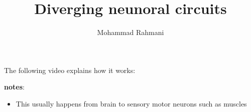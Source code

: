\documentclass[a4paper]{article}
\title{Diverging neunoral circuits}
\date{}
\author{Mohammad Rahmani}
\begin{document}
    \maketitle
    The following video explains how it works:
    
    \textbf{notes}:
    \begin{itemize}
        \item This usually happens from brain to sensory motor neurons such as muscles
    \end{itemize}
    
    
    
\end{document}
